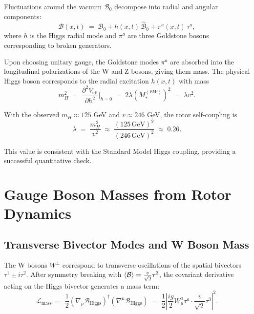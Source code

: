 \documentclass[11pt,a4paper]{article}
\newcommand{\Biv}{\mathcal{B}}
\newcommand{\D}{\nabla}                        %
\newcommand{\Lag}{\mathcal{L}}
\theoremstyle{definition}
\theoremstyle{plain}
\theoremstyle{remark}
\begin{document}
Fluctuations around the vacuum $\Biv_0$ decompose into radial and angular components:
\begin{equation}
  \Biv(x,t) \;=\; \Biv_0 + h(x,t)\,\hat{\Biv}_0 + \pi^a(x,t)\,\tau^a,
\end{equation}
where $h$ is the Higgs radial mode and $\pi^a$ are three Goldstone bosons corresponding to broken generators.

Upon choosing unitary gauge, the Goldstone modes $\pi^a$ are absorbed into the longitudinal polarizations of the W and Z bosons, giving them mass. The physical Higgs boson corresponds to the radial excitation $h(x,t)$ with mass
\begin{equation}
  m_H^2 \;=\; \frac{\partial^2 V_{\text{eff}}}{\partial h^2}\bigg|_{h=0}
  \;=\; 2\lambda (M_*^{(EW)})^2
  \;=\; \lambda v^2.
\end{equation}

With the observed $m_H \approx 125$ GeV and $v \approx 246$ GeV, the rotor self-coupling is
\begin{equation}
  \lambda \;=\; \frac{m_H^2}{v^2} \;\approx\; \frac{(125\,\text{GeV})^2}{(246\,\text{GeV})^2} \;\approx\; 0.26.
\end{equation}

This value is consistent with the Standard Model Higgs coupling, providing a successful quantitative check.

\vspace{1em}

\section{Gauge Boson Masses from Rotor Dynamics}\label{sec:gauge-masses}

\subsection{Transverse Bivector Modes and W Boson Mass}

The W bosons $W^\pm$ correspond to transverse oscillations of the spatial bivectors $\tau^1 \pm i\tau^2$. After symmetry breaking with $\ev{\Biv} = \frac{v}{\sqrt{2}}\tau^3$, the covariant derivative acting on the Higgs bivector generates a mass term:
\begin{equation}
  \Lag_{\text{mass}} \;=\; \frac{1}{2}(\D_\mu \Biv_{\text{Higgs}})^\dagger(\D^\mu \Biv_{\text{Higgs}})
  \;=\; \frac{1}{2}\left|\frac{ig}{2}W_\mu^a\tau^a \cdot \frac{v}{\sqrt{2}}\tau^3\right|^2.
\end{equation}
\end{document}

